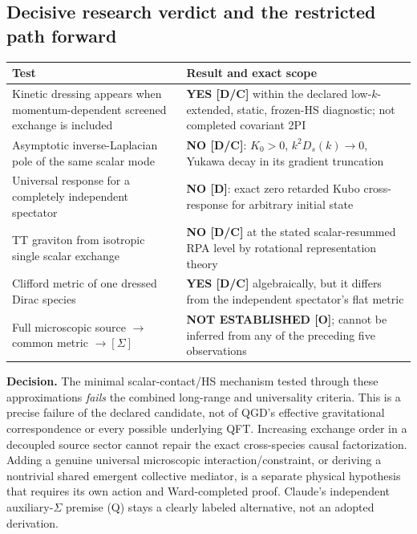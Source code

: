 \documentclass[11pt,a4paper]{article}
\begin{document}
\subsection{Decisive research verdict and the restricted path forward}\label{sec:v11-verdict}
\begin{center}\small
\begin{tabularx}{\linewidth}{@{}p{.38\linewidth}X@{}}\toprule
Test&Result and exact scope\\\midrule
Kinetic dressing appears when momentum-dependent screened exchange is included&\textbf{YES [D/C]} within the declared low-$k$-extended, static, frozen-HS diagnostic; not completed covariant 2PI\\
Asymptotic inverse-Laplacian pole of the same scalar mode&\textbf{NO [D/C]}: $K_0>0$, $k^2D_s(k)\to0$, Yukawa decay in its gradient truncation\\
Universal response for a completely independent spectator&\textbf{NO [D]}: exact zero retarded Kubo cross-response for arbitrary initial state\\
TT graviton from isotropic single scalar exchange&\textbf{NO [D/C]} at the stated scalar-resummed RPA level by rotational representation theory\\
Clifford metric of one dressed Dirac species&\textbf{YES [D/C]} algebraically, but it differs from the independent spectator's flat metric\\
Full microscopic source $\to$ common metric $\to[\Sigma]$&\textbf{NOT ESTABLISHED [O]}; cannot be inferred from any of the preceding five observations\\\bottomrule
\end{tabularx}
\end{center}
\textbf{Decision.} The minimal scalar-contact/HS mechanism tested through these approximations \emph{fails} the combined long-range and universality criteria. This is a precise failure of the declared candidate, not of QGD's effective gravitational correspondence or every possible underlying QFT. Increasing exchange order in a decoupled source sector cannot repair the exact cross-species causal factorization. Adding a genuine universal microscopic interaction/constraint, or deriving a nontrivial shared emergent collective mediator, is a separate physical hypothesis that requires its own action and Ward-completed proof. Claude's independent auxiliary-$\Sigma$ premise (Q) stays a clearly labeled alternative, not an adopted derivation.
\end{document}
